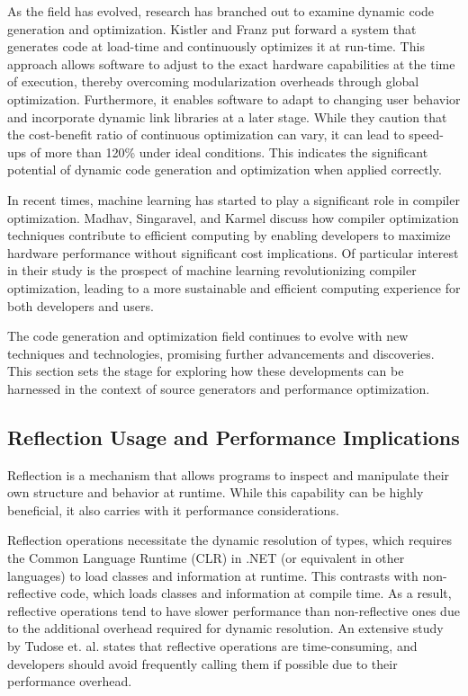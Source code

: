 As the field has evolved, research has branched out to examine dynamic code generation and optimization. Kistler and Franz \cite{Kistler2003} put forward a system that generates code at load-time and continuously optimizes it at run-time. This approach allows software to adjust to the exact hardware capabilities at the time of execution, thereby overcoming modularization overheads through global optimization. Furthermore, it enables software to adapt to changing user behavior and incorporate dynamic link libraries at a later stage. While they caution that the cost-benefit ratio of continuous optimization can vary, it can lead to speed-ups of more than 120\% under ideal conditions. This indicates the significant potential of dynamic code generation and optimization when applied correctly.

In recent times, machine learning has started to play a significant role in compiler optimization. Madhav, Singaravel, and Karmel \cite{Shreyas2021} discuss how compiler optimization techniques contribute to efficient computing by enabling developers to maximize hardware performance without significant cost implications. Of particular interest in their study is the prospect of machine learning revolutionizing compiler optimization, leading to a more sustainable and efficient computing experience for both developers and users.

The code generation and optimization field continues to evolve with new techniques and technologies, promising further advancements and discoveries. This section sets the stage for exploring how these developments can be harnessed in the context of source generators and performance optimization.

\subsection{Reflection Usage and Performance Implications}

Reflection is a mechanism that allows programs to inspect and manipulate their own structure and behavior at runtime. While this capability can be highly beneficial, it also carries with it performance considerations.

Reflection operations necessitate the dynamic resolution of types, which requires the Common Language Runtime (CLR) in .NET (or equivalent in other languages) to load classes and information at runtime. This contrasts with non-reflective code, which loads classes and information at compile time. As a result, reflective operations tend to have slower performance than non-reflective ones due to the additional overhead required for dynamic resolution. An extensive study by Tudose et. al. \cite{Tudose2013} states that reflective operations are time-consuming, and developers should avoid frequently calling them if possible due to their performance overhead.

